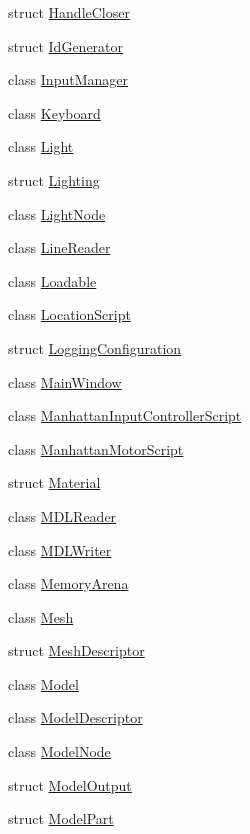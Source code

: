 \begin{DoxyCompactItemize}
struct \hyperlink{structmage_1_1_handle_closer}{Handle\+Closer}
\item 
struct \hyperlink{structmage_1_1_id_generator}{Id\+Generator}
\item 
class \hyperlink{classmage_1_1_input_manager}{Input\+Manager}
\item 
class \hyperlink{classmage_1_1_keyboard}{Keyboard}
\item 
class \hyperlink{classmage_1_1_light}{Light}
\item 
struct \hyperlink{structmage_1_1_lighting}{Lighting}
\item 
class \hyperlink{classmage_1_1_light_node}{Light\+Node}
\item 
class \hyperlink{classmage_1_1_line_reader}{Line\+Reader}
\item 
class \hyperlink{classmage_1_1_loadable}{Loadable}
\item 
class \hyperlink{classmage_1_1_location_script}{Location\+Script}
\item 
struct \hyperlink{structmage_1_1_logging_configuration}{Logging\+Configuration}
\item 
class \hyperlink{classmage_1_1_main_window}{Main\+Window}
\item 
class \hyperlink{classmage_1_1_manhattan_input_controller_script}{Manhattan\+Input\+Controller\+Script}
\item 
class \hyperlink{classmage_1_1_manhattan_motor_script}{Manhattan\+Motor\+Script}
\item 
struct \hyperlink{structmage_1_1_material}{Material}
\item 
class \hyperlink{classmage_1_1_m_d_l_reader}{M\+D\+L\+Reader}
\item 
class \hyperlink{classmage_1_1_m_d_l_writer}{M\+D\+L\+Writer}
\item 
class \hyperlink{classmage_1_1_memory_arena}{Memory\+Arena}
\item 
class \hyperlink{classmage_1_1_mesh}{Mesh}
\item 
struct \hyperlink{structmage_1_1_mesh_descriptor}{Mesh\+Descriptor}
\item 
class \hyperlink{classmage_1_1_model}{Model}
\item 
class \hyperlink{classmage_1_1_model_descriptor}{Model\+Descriptor}
\item 
class \hyperlink{classmage_1_1_model_node}{Model\+Node}
\item 
struct \hyperlink{structmage_1_1_model_output}{Model\+Output}
\item 
struct \hyperlink{structmage_1_1_model_part}{Model\+Part}

\end{DoxyCompactItemize}
